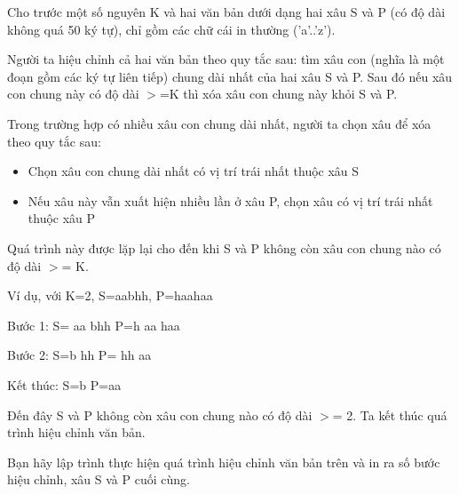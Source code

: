 Cho trước một số nguyên K và hai văn bản dưới dạng hai xâu S và P (có độ dài không quá 50 ký tự), chỉ gồm các chữ cái in thường ('a'..'z').  

   Người ta hiệu chỉnh cả hai văn bản theo quy tắc sau: tìm xâu con (nghĩa là một đoạn gồm các ký tự liên tiếp) chung dài nhất của hai xâu S và P. Sau đó nếu xâu con chung này có độ dài $>$=K thì xóa xâu con chung này khỏi S và P.  

   Trong trường hợp có nhiều xâu con chung dài nhất, người ta chọn xâu để xóa theo quy tắc sau:  
\begin{itemize}
	\item     Chọn xâu con chung dài nhất có vị trí trái nhất thuộc xâu S   
	\item     Nếu xâu này vẫn xuất hiện nhiều lần ở xâu P, chọn xâu có vị trí trái nhất thuộc xâu P   
\end{itemize}

   Quá trình này được lặp lại cho đến khi S và P không còn xâu con chung nào có độ dài $>$= K.  

   Ví dụ, với K=2, S=aabhh, P=haahaa  

   Bước 1:  S=       aa      bhh  P=h       aa      haa  

   Bước 2:  S=b       hh      P=       hh      aa  

   Kết thúc: S=b   P=aa  

   Đến đây S và P không còn xâu con chung nào có độ dài $>$= 2. Ta kết thúc quá trình hiệu chỉnh văn bản.  

   Bạn hãy lập trình thực hiện quá trình hiệu chỉnh văn bản trên và in ra số bước hiệu chỉnh, xâu S và P cuối cùng.  

\